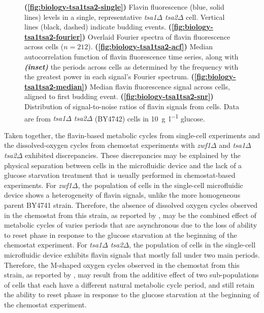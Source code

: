 \begin{figure}
  \caption[
    Flavin fluorescence levels in a single, representative \textit{tsa1$\Delta$ tsa2$\Delta$} cell.
    Overlaid Fourier spectra of flavin fluorescence across cells.
    Median autocorrelation function of flavin fluorescence time series, along with the periods across cells.
    Median flavin fluorescence signal across cells, aligned to first budding event.
    Distribution of signal-to-noise ratios of flavin signals from cells.
    Data are from \textit{tsa1$\Delta$ tsa2$\Delta$} (BY4742) cells in \SI{10}{\gram~\litre^{-1}} glucose.
  ]{
    \textbf{(\ref{fig:biology-tsa1tsa2-single})}
    Flavin fluorescence (blue, solid lines) levels in a single, representative \textit{tsa1$\Delta$ tsa2$\Delta$} cell.
    Vertical lines (black, dashed) indicate budding events.
    \textbf{(\ref{fig:biology-tsa1tsa2-fourier})}
    Overlaid Fourier spectra of flavin fluorescence across cells ($n=212$).
    \textbf{(\ref{fig:biology-tsa1tsa2-acf})}
    Median autocorrelation function of flavin fluorescence time series, along with \textit{\textbf{(inset)}} the periods across cells as determined by the frequency with the greatest power in each signal's Fourier spectrum.
    \textbf{(\ref{fig:biology-tsa1tsa2-median})}
    Median flavin fluorescence signal across cells, aligned to first budding event.
    \textbf{(\ref{fig:biology-tsa1tsa2-snr})}
    Distribution of signal-to-noise ratios of flavin signals from cells.
    Data are from \textit{tsa1$\Delta$ tsa2$\Delta$} (BY4742) cells in \SI{10}{\gram~\litre^{-1}} glucose.
  }
  \label{fig:biology-tsa1tsa2}
\end{figure}

Taken together, the flavin-based metabolic cycles from single-cell experiments and the dissolved-oxygen cycles from chemostat experiments with \textit{zwf1$\Delta$} and \textit{tsa1$\Delta$ tsa2$\Delta$} exhibited discrepancies.
These discrepancies may be explained by the physical separation between cells in the microfluidic device and the lack of a glucose starvation treatment that is usually performed in chemostat-based experiments.
For \textit{zwf1$\Delta$}, the population of cells in the single-cell microfluidic device shows a heterogeneity of flavin signals, unlike the more homogeneous parent BY4741 strain.
Therefore, the absence of dissolved oxygen cycles observed in the chemostat from this strain, as reported by \textcite{tuCyclicChangesMetabolic2007}, may be the combined effect of metabolic cycles of varies periods that are asynchronous due to the loss of ability to reset phase in response to the glucose starvation at the beginning of the chemostat experiment.
For \textit{tsa1$\Delta$ tsa2$\Delta$}, the population of cells in the single-cell microfluidic device exhibits flavin signals that mostly fall under two main periods.
Therefore, the M-shaped oxygen cycles observed in the chemostat from this strain, as reported by \textcite{caustonMetabolicCyclesYeast2015}, may result from the additive effect of two sub-populations of cells that each have a different natural metabolic cycle period, and still retain the ability to reset phase in response to the glucose starvation at the beginning of the chemostat experiment.


